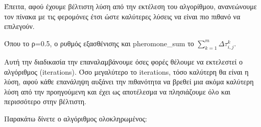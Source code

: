 Έπειτα, αφού έχουμε βέλτιστη λύση από την εκτέλεση του αλγορίθμου, ανανεώνουμε τον πίνακα με τις φερομόνες έτσι ώστε καλύτερες λύσεις να είναι πιο πιθανό να επιλεγούν.

Όπου το ρ=0.5, ο ρυθμός εξασθένισης και pheromone\_sum το $\sum_{k=1}^{m}{Δτ^k_{i,j}}$. 


Αυτή την διαδικασία την επαναλαμβάνουμε όσες φορές θέλουμε να εκτελεστεί ο αλγόριθμος (iterations). Όσο μεγαλύτερο το iterations, τόσο καλύτερη θα είναι η λύση, αφού κάθε επανάληψη αυξάνει την πιθανότητα να βρεθεί μια ακόμα καλύτερη λύση από την προηγούμενη και έχει ως αποτέλεσμα να πλησιάζουμε όλο και περισσότερο στην βέλτιστη.

Παρακάτω δίνετε ο αλγόριθμος ολοκληρωμένος:



